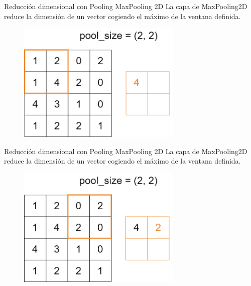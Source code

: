 \begin{frame}{Reducción dimensional con Pooling}
\alert{\Large MaxPooling 2D}
La capa de MaxPooling2D reduce la dimensión de un vector cogiendo el \alert{máximo} de la ventana definida.

\begin{figure}
    \centering
    \includegraphics[width=0.7\textwidth]{Slides/figures/Tema 3/MaxPooling_2.png}
\end{figure}
\end{frame}

\begin{frame}{Reducción dimensional con Pooling}
\alert{\Large MaxPooling 2D}
La capa de MaxPooling2D reduce la dimensión de un vector cogiendo el \alert{máximo} de la ventana definida.

\begin{figure}
    \centering
    \includegraphics[width=0.7\textwidth]{Slides/figures/Tema 3/MaxPooling_3.png}
\end{figure}
\end{frame}

